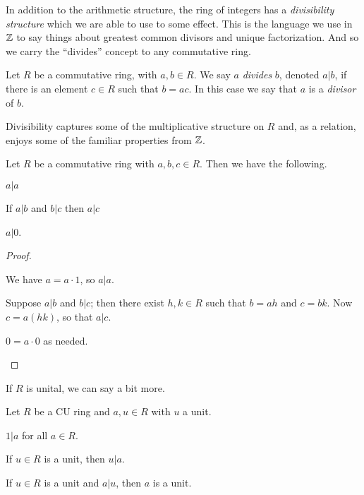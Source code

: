 In addition to the arithmetic structure, the ring of integers has a \emph{divisibility structure} which we are able to use to some effect. This is the language we use in \(\mathbb{Z}\) to say things about greatest common divisors and unique factorization. And so we carry the ``divides'' concept to any commutative ring.

\begin{dfn}[Divides] \label{dfn:divides}
Let \(R\) be a commutative ring, with \(a,b \in R\). We say \(a\) \emph{divides} \(b\), denoted \(a|b\), if there is an element \(c \in R\) such that \(b = ac\). In this case we say that \(a\) is a \emph{divisor} of \(b\). 
\end{dfn}

Divisibility captures some of the multiplicative structure on \(R\) and, as a relation, enjoys some of the familiar properties from \(\mathbb{Z}\).

\begin{prop} \label{prop:divides-basics}
Let \(R\) be a commutative ring with \(a,b,c \in R\). Then we have the following.
\begin{proplist*}
\item \(a|a\) \label{prop:divides-basics:refl}
\item If \(a|b\) and \(b|c\) then \(a|c\) \label{prop:divides-basics:trans}
\item \(a|0\). \label{prop:divides-basics:zero}
\end{proplist*}
\end{prop}

\begin{proof}
\begin{inlineproplist}
\item We have \(a = a \cdot 1\), so \(a|a\).
\item Suppose \(a|b\) and \(b|c\); then there exist \(h,k \in R\) such that \(b = ah\) and \(c = bk\). Now \(c = a(hk)\), so that \(a|c\).
\item \(0 = a \cdot 0\) as needed.
\end{inlineproplist}
\end{proof}

If \(R\) is unital, we can say a bit more.

\begin{prop} \label{prop:divides-u-basics}
Let \(R\) be a CU ring and \(a,u \in R\) with \(u\) a unit.
\begin{proplist*}
\item \(1|a\) for all \(a \in R\). \label{prop:divides-u-basics:one}
\item If \(u \in R\) is a unit, then \(u|a\). \label{prop:divides-u-basics:unit}
\item If \(u \in R\) is a unit and \(a|u\), then \(a\) is a unit. \label{prop:divides-u-basics:unit-div}
\end{proplist*} 
\end{prop}

